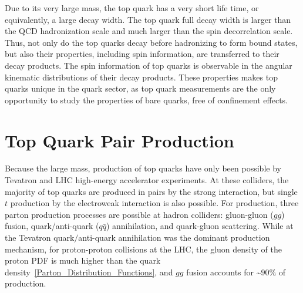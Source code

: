Due to its very large mass, the top quark has a very short life time, or equivalently, a large decay width.
The top quark full decay width is larger than the QCD hadronization scale and much larger than the spin decorrelation scale.
Thus, not only do the top quarks decay before hadronizing to form bound states, but also their properties, including spin information, are transferred to their decay products.
The spin information of top quarks is observable in the angular kinematic distributions of their decay products.
These properties makes top quarks unique in the quark sector, as top quark measurements are the only opportunity to study the properties of bare quarks, free of confinement effects.

\section{Top Quark Pair Production}
Because the large mass, production of top quarks have only been possible by Tevatron and LHC high-energy accelerator experiments.
At these colliders, the majority of top quarks are produced in \ttbar pairs by the strong interaction, but single $t$ production by the electroweak interaction is also possible.
For \ttbar production, three parton production processes are possible at hadron colliders: gluon-gluon ($gg$) fusion, quark/anti-quark ($q\bar{q}$) annihilation, and quark-gluon scattering.
While at the Tevatron quark$\slash$anti-quark annihilation was the dominant production mechanism, for \beamenergy proton-proton collisions at the LHC, the gluon density of the proton PDF is much higher than the quark density~\ref{Parton_Distribution_Functions}, and $gg$ fusion accounts for \sim$90 \%$ of \ttbar production.

